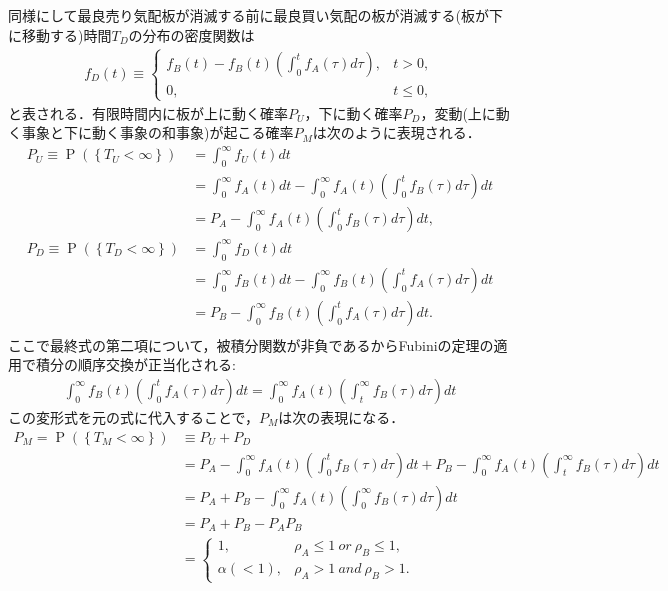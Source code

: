 \documentclass[a4j,papersize,disablejfam,slide,14pt]{jsarticle}
\def\prob#1{\operatorname{P} \left(\left\{ #1 \right\}\right)} %
\begin{document}
    同様にして最良売り気配板が消滅する前に最良買い気配の板が消滅する(板が下に移動する)時間$T_D$の分布の密度関数は
    \begin{align}
    	f_D(t) \equiv \begin{cases}
        	f_B(t) - f_B(t)\left( \int_{0}^{t}f_A(\tau)d\tau \right), & t>0, \\
            0, & t \leq 0,
        \end{cases}
    \end{align}
    と表される．有限時間内に板が上に動く確率$P_U$，下に動く確率$P_D$，変動(上に動く事象と下に動く事象の和事象)が起こる確率$P_M$は次のように表現される．
    \begin{align}
    	P_U \equiv \prob{T_U < \infty} &= \int_{0}^{\infty} f_U(t) dt \\
        &= \int_{0}^{\infty} f_A(t)dt - \int_{0}^{\infty} f_A(t) \left( \int_{0}^{t} f_B(\tau)d\tau \right) dt \\
        &= P_A - \int_{0}^{\infty} f_A(t) \left( \int_{0}^{t} f_B(\tau)d\tau \right) dt, \\
        P_D \equiv \prob{T_D < \infty} &= \int_{0}^{\infty} f_D(t) dt \\
        &= \int_{0}^{\infty} f_B(t)dt - \int_{0}^{\infty} f_B(t) \left( \int_{0}^{t} f_A(\tau)d\tau \right) dt \\
        &= P_B - \int_{0}^{\infty} f_B(t) \left( \int_{0}^{t} f_A(\tau)d\tau \right) dt. \\
    \end{align}
    ここで最終式の第二項について，被積分関数が非負であるから{\rm Fubini}の定理の適用で積分の順序交換が正当化される:
    \begin{align}
    	\int_{0}^{\infty} f_B(t) \left( \int_{0}^{t} f_A(\tau)d\tau \right) dt = \int_{0}^{\infty} f_A(t) \left( \int_{t}^{\infty} f_B(\tau)d\tau \right) dt
    \end{align}
    この変形式を元の式に代入することで，$P_M$は次の表現になる．
    \begin{align}
    	P_M = \prob{T_M < \infty} &\equiv P_U + P_D \\
        &= P_A - \int_{0}^{\infty} f_A(t) \left( \int_{0}^{t} f_B(\tau)d\tau \right) dt + 
        	P_B - \int_{0}^{\infty} f_A(t) \left( \int_{t}^{\infty} f_B(\tau)d\tau \right) dt \\
        &= P_A + P_B - \int_{0}^{\infty} f_A(t) \left( \int_{0}^{\infty} f_B(\tau)d\tau \right) dt \\
        &= P_A + P_B - P_A P_B \\
        &= \begin{cases}
        	1, & \rho_A \leq 1\ or\ \rho_B \leq 1, \\
            \alpha(< 1), & \rho_A > 1\ and\ \rho_B > 1.
        \end{cases}
    \end{align}
    
\end{document}
